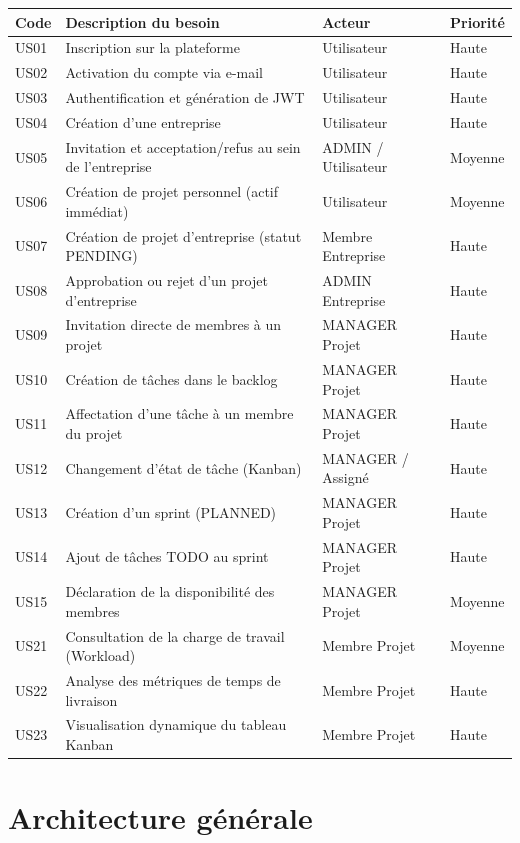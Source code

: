 \documentclass[12pt,a4paper]{report}
\begin{document}
\begin{longtable}{|p{1.5cm}|p{7cm}|p{3.5cm}|p{2cm}|}
\hline
\textbf{Code} & \textbf{Description du besoin} & \textbf{Acteur} & \textbf{Priorité} \\ \hline
US01 & Inscription sur la plateforme & Utilisateur & Haute \\ \hline
US02 & Activation du compte via e-mail & Utilisateur & Haute \\ \hline
US03 & Authentification et génération de JWT & Utilisateur & Haute \\ \hline
US04 & Création d'une entreprise & Utilisateur & Haute \\ \hline
US05 & Invitation et acceptation/refus au sein de l'entreprise & ADMIN / Utilisateur & Moyenne \\ \hline
US06 & Création de projet personnel (actif immédiat) & Utilisateur & Moyenne \\ \hline
US07 & Création de projet d'entreprise (statut PENDING) & Membre Entreprise & Haute \\ \hline
US08 & Approbation ou rejet d'un projet d'entreprise & ADMIN Entreprise & Haute \\ \hline
US09 & Invitation directe de membres à un projet & MANAGER Projet & Haute \\ \hline
US10 & Création de tâches dans le backlog & MANAGER Projet & Haute \\ \hline
US11 & Affectation d'une tâche à un membre du projet & MANAGER Projet & Haute \\ \hline
US12 & Changement d'état de tâche (Kanban) & MANAGER / Assigné & Haute \\ \hline
US13 & Création d'un sprint (PLANNED) & MANAGER Projet & Haute \\ \hline
US14 & Ajout de tâches TODO au sprint & MANAGER Projet & Haute \\ \hline
US15 & Déclaration de la disponibilité des membres & MANAGER Projet & Moyenne \\ \hline
US21 & Consultation de la charge de travail (Workload) & Membre Projet & Moyenne \\ \hline
US22 & Analyse des métriques de temps de livraison & Membre Projet & Haute \\ \hline
US23 & Visualisation dynamique du tableau Kanban & Membre Projet & Haute \\ \hline
\end{longtable}

\section{Architecture générale}
\end{document}
